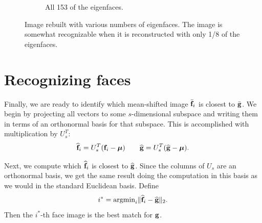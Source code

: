 \begin{figure}
\begin{subfigure}[b]{0.3\textwidth}
\caption{All 153 of the eigenfaces.}
\label{fig:all_efaces}
\end{subfigure}
\caption{Image rebuilt with various numbers of eigenfaces. The image is somewhat recognizable when it is reconstructed with only 1/8 of the eigenfaces.}
\label{fig:rebuiltImage}
\end{figure}

\section*{Recognizing faces}
Finally, we are ready to identify which mean-shifted image $\bar{{\bf f}}_i$ is closest to $\bar{{\bf g}}$. 
We begin by projecting all vectors to some $s$-dimensional subspace and writing them in terms of an orthonormal basis for that subspace. 
This is accomplished with multiplication by $U_s^T$:
\[
\widehat{{\bf f}}_i = U_s^T({\bf f}_i-{\boldsymbol \mu}) \qquad \widehat{{\bf g}} = U_s^T(\widehat{{\bf g}}-{\boldsymbol \mu}).
\]

Next, we compute which $\widehat{{\bf f}}_i$ is closest to $\widehat{{\bf g}}$. 
Since the columns of $U_s$ are an orthonormal basis, we get the same result doing the computation in this basis as we would in the standard Euclidean basis.
Define
\[
i^* = \text{argmin}_i \|\widehat{{\bf f}}_i - \widehat{{\bf g}}\|_2.
\]
Then the $i^*$-th face image is the best match for ${\bf g}$.

